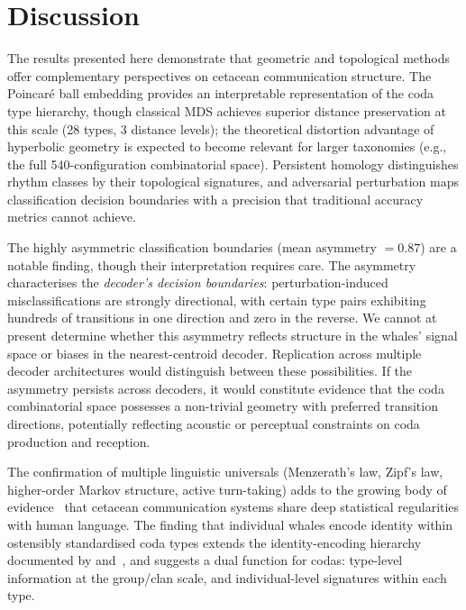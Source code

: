 \documentclass[11pt,a4paper]{article}
\begin{document}
\section{Discussion}

The results presented here demonstrate that geometric and topological
methods offer complementary perspectives on cetacean communication
structure. The Poincar\'e ball embedding provides an interpretable
representation of the coda type hierarchy, though classical MDS achieves
superior distance preservation at this scale (28 types, 3 distance
levels); the theoretical distortion advantage of hyperbolic geometry is
expected to become relevant for larger taxonomies (e.g., the full
540-configuration combinatorial space). Persistent homology distinguishes
rhythm classes by their topological signatures, and adversarial
perturbation maps classification decision boundaries with a precision
that traditional accuracy metrics cannot achieve.

The highly asymmetric classification boundaries (mean asymmetry
$= 0.87$) are a notable finding, though their interpretation requires
care. The asymmetry characterises the \emph{decoder's decision
boundaries}: perturbation-induced misclassifications are strongly
directional, with certain type pairs exhibiting hundreds of transitions
in one direction and zero in the reverse. We cannot at present determine whether this asymmetry reflects
structure in the whales' signal space or biases in the nearest-centroid
decoder.
Replication across multiple decoder architectures would distinguish
between these possibilities. If the asymmetry persists across decoders,
it would constitute evidence that the coda combinatorial space possesses
a non-trivial geometry with preferred transition directions, potentially
reflecting acoustic or perceptual constraints on coda production and
reception.

The confirmation of multiple linguistic universals (Menzerath's law,
Zipf's law, higher-order Markov structure, active turn-taking) adds to
the growing body of evidence~\citep{Youngblood2025} that cetacean
communication systems share deep statistical regularities with human
language. The finding that individual whales encode identity within
ostensibly standardised coda types extends the identity-encoding
hierarchy documented by \citet{Gero2016} and~\citet{Hersh2022}, and
suggests a dual function for codas: type-level information at the
group/clan scale, and individual-level signatures within each type.
\end{document}
